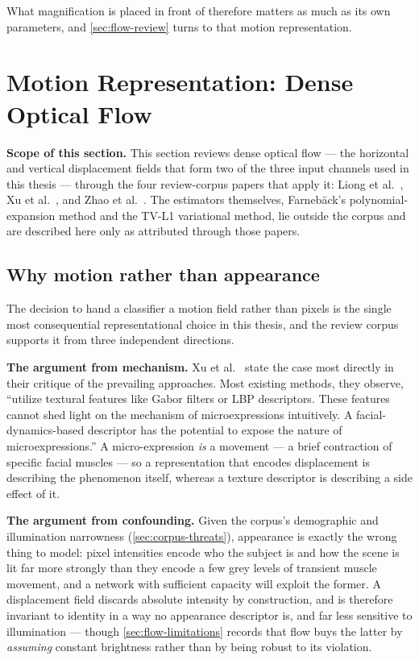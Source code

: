 What magnification is placed in front of therefore matters as much as its own parameters, and \autoref{sec:flow-review} turns to that motion representation.


\section{Motion Representation: Dense Optical Flow}
\label{sec:flow-review}

\textbf{Scope of this section.} This section reviews dense optical flow --- the horizontal and vertical displacement fields that form two of the three input channels used in this thesis --- through the four review-corpus papers that apply it: Liong et al.~\cite{liong2019a,liong2019b}, Xu et al.~\cite{xu2017}, and Zhao et al.~\cite{zhaoS2021}. The estimators themselves, Farneb\"ack's polynomial-expansion method and the TV-L1 variational method, lie outside the corpus and are described here only as attributed through those papers.

\subsection{Why motion rather than appearance}
\label{sec:why-flow}

The decision to hand a classifier a motion field rather than pixels is the single most consequential representational choice in this thesis, and the review corpus supports it from three independent directions.

\textbf{The argument from mechanism.} Xu et al.~\cite{xu2017} state the case most directly in their critique of the prevailing approaches. Most existing methods, they observe, ``utilize textural features like Gabor filters or LBP descriptors. These features cannot shed light on the mechanism of microexpressions intuitively. A facial-dynamics-based descriptor has the potential to expose the nature of microexpressions.'' A micro-expression \textit{is} a movement --- a brief contraction of specific facial muscles --- so a representation that encodes displacement is describing the phenomenon itself, whereas a texture descriptor is describing a side effect of it.

\textbf{The argument from confounding.} Given the corpus's demographic and illumination narrowness (\autoref{sec:corpus-threats}), appearance is exactly the wrong thing to model: pixel intensities encode who the subject is and how the scene is lit far more strongly than they encode a few grey levels of transient muscle movement, and a network with sufficient capacity will exploit the former. A displacement field discards absolute intensity by construction, and is therefore invariant to identity in a way no appearance descriptor is, and far less sensitive to illumination --- though \autoref{sec:flow-limitations} records that flow buys the latter by \textit{assuming} constant brightness rather than by being robust to its violation.

